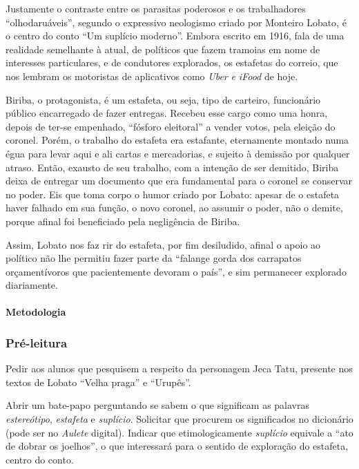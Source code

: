 \documentclass[11pt]{extarticle}
\begin{document}
Justamente o contraste entre os parasitas poderosos e os trabalhadores
``olhodaruáveis'', segundo o expressivo neologismo criado por Monteiro
Lobato, é o centro do conto ``Um suplício moderno''. Embora escrito em
1916, fala de uma realidade semelhante à atual, de políticos que fazem
tramoias em nome de interesses particulares, e de condutores explorados,
os estafetas do correio, que nos lembram os motoristas de aplicativos
como \emph{Uber} \emph{e iFood} de hoje.

Biriba, o protagonista, é um estafeta, ou seja, tipo de carteiro,
funcionário público encarregado de fazer entregas. Recebeu esse cargo
como uma honra, depois de ter-se empenhado, ``fósforo eleitoral'' a
vender votos, pela eleição do coronel. Porém, o trabalho do estafeta era
estafante, eternamente montado numa égua para levar aqui e ali cartas e
mercadorias, e sujeito à demissão por qualquer atraso. Então, exausto de
seu trabalho, com a intenção de ser demitido, Biriba deixa de entregar
um documento que era fundamental para o coronel se conservar no poder.
Eis que toma corpo o humor criado por Lobato: apesar de o estafeta haver
falhado em sua função, o novo coronel, ao assumir o poder, não o demite,
porque afinal foi beneficiado pela negligência de Biriba.

Assim, Lobato nos faz rir do estafeta, por fim desiludido, afinal o
apoio ao político não lhe permitiu fazer parte da ``falange gorda dos
carrapatos orçamentívoros que pacientemente devoram o país'', e sim
permanecer explorado diariamente.

\paragraph{Metodologia}

\subsubsection{Pré-leitura}

Pedir aos alunos que pesquisem a respeito da personagem Jeca Tatu,
presente nos textos de Lobato ``Velha praga'' e ``Urupês''.

Abrir um bate-papo perguntando se sabem o que significam as palavras
\emph{estereótipo}, \emph{estafeta} e \emph{suplício}. Solicitar que
procurem os significados no dicionário (pode ser no \emph{Aulete}
digital). Indicar que etimologicamente \emph{suplício} equivale a ``ato
de dobrar os joelhos'', o que interessará para o sentido de exploração
do estafeta, centro do conto.
\end{document}
